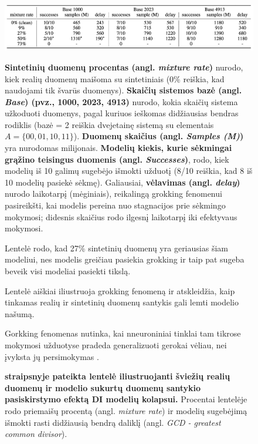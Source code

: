 \documentclass{VUMIFInfKursinis}
\begin{document}
\begin{enumerate}
        \begin{figure}[H]
    \centering
    \includegraphics[scale=0.5]{img/gorkking.png}
    \caption{
        \textbf{\cite{DesniuPasiulymai} straipsnyje pateikta lentelė iliustruojanti šviežių realių duomenų ir modelio sukurtų duomenų santykio pasiskirstymo efektą DI modelių kolapsui.} 
        Procentai lentelėje rodo priemaišų procentą (angl. \textsl{mixture rate}) ir modelių sugebėjimą išmokti rasti didžiausią bendrą daliklį (angl. \textsl{GCD - greatest common divisor}).
        }
       \label{img:gorkking}
        \textbf{Sintetinių duomenų procentas (angl. \textsl{mixture rate})} nurodo, kiek realių duomenų maišoma su sintetiniais (0\% reiškia, kad naudojami tik švarūs duomenys). \textbf{Skaičių sistemos bazė (angl. \textsl{Base}) (pvz., 1000, 2023, 4913)} nurodo, kokia skaičių sistema užkoduoti duomenys, pagal kuriuos ieškomas didžiausias bendras rodiklis (bazė = 2 reiškia dvejetainę sistemą su elementais $A=\{00,01,10,11\}$). \textbf{Duomenų skaičius (angl. \textsl{Samples (M)})} yra nurodomas milijonais. \textbf{Modelių kiekis, kurie sėkmingai grąžino teisingus duomenis (angl. \textsl{Successes})}, rodo, kiek modelių iš 10 galimų sugebėjo išmokti užduotį (8/10 reiškia, kad 8 iš 10 modelių pasiekė sėkmę). Galiausiai, \textbf{vėlavimas (angl. \textsl{delay})} nurodo laikotarpį (mėginiais), reikalingą grokking fenomenui pasireikšti, kai modelis pereina nuo stagnacijos prie sėkmingo mokymosi; didesnis skaičius rodo ilgesnį laikotarpį iki efektyvaus mokymosi.
        
        Lentelė rodo, kad 27\% sintetinių duomenų yra geriausias šiam modeliui, nes modelis greičiau pasiekia grokking ir taip pat sugeba beveik visi modeliai pasiekti tikslą.

        
        Lentelė aiškiai iliustruoja grokking fenomeną ir atskleidžia, kaip tinkamas realių ir sintetinių duomenų santykis gali lemti modelio našumą.

        Gorkking fenomenas nutinka, kai nneuroniniai tinklai tam tikrose mokymosi užduotyse pradeda generalizuoti gerokai vėliau, nei įvyksta jų persimokymas \cite{grokking}.
\end{figure}




\end{enumerate}
\end{document}

